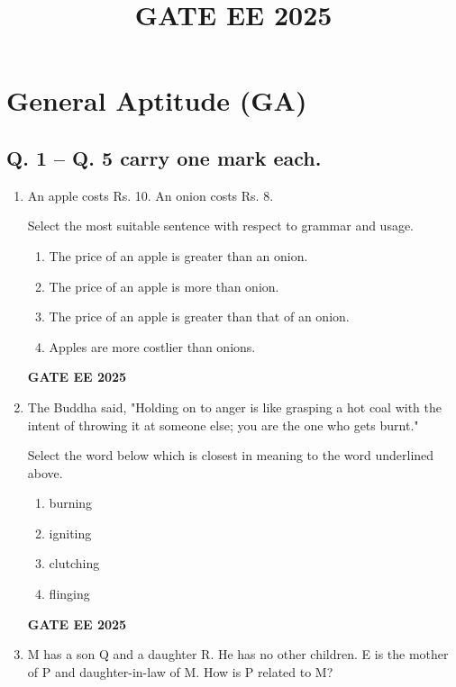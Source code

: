 \documentclass[twocolumn]{article}
\title{GATE EE 2025}
\date{}
\begin{document}
\maketitle

\section*{General Aptitude (GA)}

\subsection*{Q. 1 – Q. 5 carry one mark each.}

\begin{enumerate}[label=Q.\arabic*]
    \item An apple costs Rs. 10. An onion costs Rs. 8. 
    
    Select the most suitable sentence with respect to grammar and usage.
    
    \begin{enumerate}[label=(\Alph*)]
        \item The price of an apple is greater than an onion.
        \item The price of an apple is more than onion.
        \item The price of an apple is greater than that of an onion.
        \item Apples are more costlier than onions.
    \end{enumerate}
    
    \textbf{GATE EE 2025}
    
    \item The Buddha said, "Holding on to anger is like grasping a hot coal with the intent of throwing it at someone else; you are the one who gets burnt."
    
    Select the word below which is closest in meaning to the word underlined above.
    
    \begin{enumerate}[label=(\Alph*)]
        \item burning 
        \item igniting 
        \item clutching 
        \item flinging
    \end{enumerate}
    
    \textbf{GATE EE 2025}
    
    \item M has a son Q and a daughter R. He has no other children. E is the mother of P and daughter-in-law of M. How is P related to M?
    

\end{enumerate}
\end{document}
